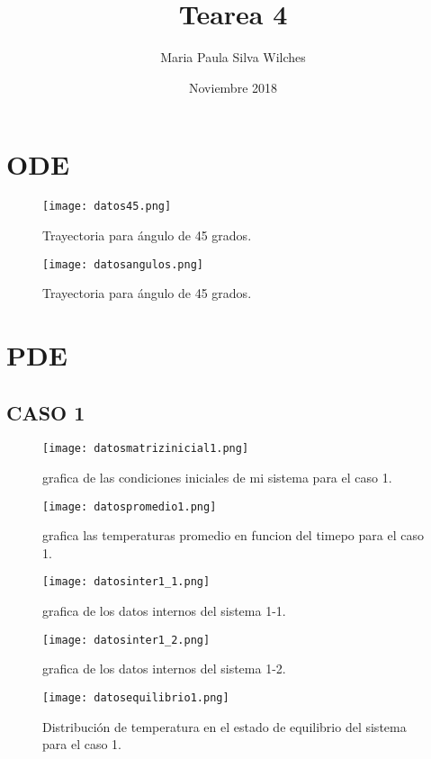 \documentclass{article}
\title{Tearea 4}
\author{Maria Paula Silva Wilches }
\date{Noviembre 2018}
\begin{document}
\maketitle

\section{ODE}

\begin{figure}[htb]
	\centering
	\texttt{[image: datos45.png]}
	\caption{Trayectoria para ángulo de 45 grados.}
\end{figure}



\begin{figure}[htb]
	\centering
	\texttt{[image: datosangulos.png]}
	\caption{Trayectoria para ángulo de 45 grados.}
\end{figure}


\section{PDE}

\subsection{CASO 1}

\begin{figure}[htb]
	\centering
	\texttt{[image: datosmatrizinicial1.png]}
	\caption{grafica de las condiciones iniciales de mi sistema para el caso 1.}
\end{figure}

\begin{figure}[htb]
	\centering
	\texttt{[image: datospromedio1.png]}
	\caption{grafica las temperaturas promedio en funcion del timepo para el caso 1.}
\end{figure}

\begin{figure}[htb]
	\centering
	\texttt{[image: datosinter1\_1.png]}
	\caption{grafica de los datos internos del sistema 1-1.}
\end{figure}

\begin{figure}[htb]
	\centering
	\texttt{[image: datosinter1\_2.png]}
	\caption{grafica de los datos internos del sistema 1-2.}
\end{figure}


\begin{figure}[htb]
	\centering
	\texttt{[image: datosequilibrio1.png]}
	\caption{Distribución de temperatura en el estado de equilibrio del sistema para el caso 1.}
\end{figure}
\end{document}
